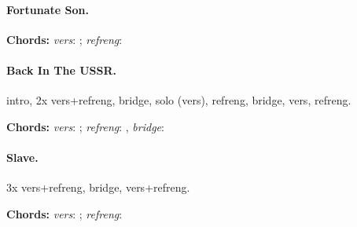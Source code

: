 \documentclass[%
twoside,                 %
final,                   %
10pt]{article}
\begin{document}
\paragraph{Fortunate Son.}


\textbf{Chords:} \emph{vers}: ; \emph{refreng}: 





\paragraph{Back In The USSR.}
intro, 2x vers+refreng, bridge, solo (vers), refreng, bridge, vers, refreng.

\textbf{Chords:} \emph{vers}: ; \emph{refreng}: ,
\emph{bridge}: 





\paragraph{Slave.}
3x vers+refreng, bridge, vers+refreng.

\textbf{Chords:} \emph{vers}: ; \emph{refreng}: 








\printindex
\end{document}

